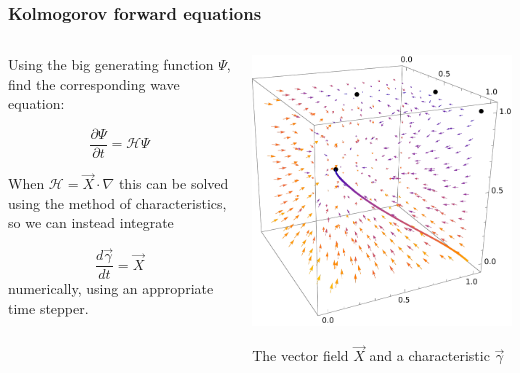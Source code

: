 \documentclass{beamer}
\begin{document}
\begin{frame}
    \frametitle{Kolmogorov forward equations}

    \begin{columns}
        \begin{column}{0.5\textwidth}
        Using the big generating function $\Psi$, find the corresponding wave
        equation:

        \begin{equation}
            \frac{\partial \Psi}{\partial t} = \mathcal{H} \Psi
        \end{equation}

        When $\mathcal{H} = \vec{X} \cdot \nabla$ this can be solved using the method of characteristics, so we can instead
        integrate

        \begin{equation}
            \frac{d \vec{\gamma}}{ dt} = \vec{X}
        \end{equation}
        numerically, using an appropriate time stepper.


        \end{column}
        \begin{column}{0.5\textwidth}
            \includegraphics[width=\textwidth]{figures/flowcube1}

            \;

            The vector field $\vec{X}$ and a characteristic $\vec{\gamma}$
        \end{column}
    \end{columns}
\end{frame}
\end{document}
